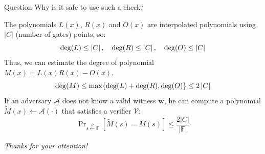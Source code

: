 \documentclass{zkdl-presentation-template}
\begin{document}
    \begin{frame}
        \begin{alertblock}{Question}
            Why is it safe to use such a check?
        \end{alertblock}

        The polynomials $L(x)$, $R(x)$ and $O(x)$ are interpolated polynomials using 
        $\left| C \right|$ (number of gates) points, so:
        \vspace{-5pt}
        \begin{equation*}
            \deg(L) \le \left| C \right|, \quad
            \deg(R) \le \left| C \right|, \quad 
            \deg(O) \le \left| C \right|
            \vspace{-5pt}
        \end{equation*}
        \pause
        Thus, we can estimate the degree of polynomial $M(x) = L(x)R(x) - O(x)$.
        \vspace{-5pt}
        \begin{equation*}
            \deg(M) \leq \max\{\deg(L) + \deg(R), \deg(O)\} \leq 2 \left| C \right|
            \vspace{-5pt}
        \end{equation*}
        \pause
        If an adversary $\mathcal{A}$ does not know a valid witness $\mathbf{w}$, he can compute a
        polynomial $\widetilde{M}(x) \gets \mathcal{A}(\cdot)$ that satisfies a verifier 
        $\mathcal{V}$:
        \vspace{-5pt}
        \begin{equation*}
            \mathop{\text{Pr}}_{s \xleftarrow{R} \mathbb{F}}[\widetilde{M}(s) = M(s)] \leq \frac{2 \left| C \right|}{|\mathbb{F}|}
        \end{equation*}
    \end{frame}

    \begin{frame}{}
        \centering \Large
        \emph{Thanks for your attention!}
    \end{frame}
\end{document}

